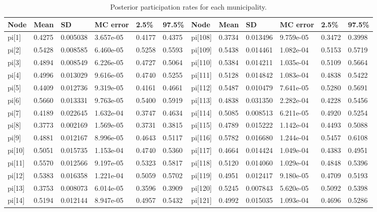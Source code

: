 \documentclass[12pt]{article}
\begin{document}
\begin{table}[h!]
\centering
\tiny
\caption{Posterior participation rates for each municipality.}
\label{tab:params1}
\begin{tabular}{|llllll|llllll|}
\hline
\textbf{Node} & \textbf{Mean} & \textbf{SD} & \textbf{MC error} & \textbf{2.5\%} &  \textbf{97.5\%} & \textbf{Node} & \textbf{Mean} & \textbf{SD} & \textbf{MC error} & \textbf{2.5\%} &  \textbf{97.5\%} \\ \hline
pi[1]  & 0.4275  & 0.005038  & 3.657e-05 & 0.4177 &0.4375 & pi[108] & 0.3734 & 0.013496 & 9.759e-05 & 0.3472 &0.3998  \\ 
pi[2]  & 0.5428  & 0.008585  & 6.460e-05 & 0.5258 &0.5593 & pi[109] & 0.5438 & 0.014461  & 1.082e-04 & 0.5153 &0.5719 \\ 
pi[3]  & 0.4894  & 0.008549  & 6.226e-05 & 0.4727 &0.5064 & pi[110] & 0.5384 & 0.014211 & 1.035e-04 & 0.5109 &0.5664 \\ 
pi[4]  & 0.4996  & 0.013029  & 9.616e-05 & 0.4740 &0.5255 & pi[111] & 0.5128 & 0.014842  & 1.083e-04 & 0.4838 &0.5422 \\ 
pi[5]  & 0.4409  & 0.012736  & 9.319e-05 & 0.4161 &0.4661 & pi[112] & 0.5487 & 0.010479   & 7.641e-05 & 0.5280 &0.5691 \\ 
pi[6]  & 0.5660  & 0.013331  & 9.763e-05 & 0.5400 &0.5919 & pi[113] & 0.4838 & 0.031350   & 2.282e-04 & 0.4228 &0.5456 \\
pi[7]  & 0.4189  & 0.022645  & 1.632e-04 & 0.3747 &0.4634 & pi[114] & 0.5085 & 0.008513   & 6.211e-05 & 0.4920 &0.5254\\ 
pi[8]  & 0.3773  & 0.002169  & 1.569e-05 & 0.3731 &0.3815 & pi[115] & 0.4789 & 0.015222   & 1.142e-04 & 0.4493 &0.5088 \\
pi[9]  & 0.4881  & 0.012167  & 8.996e-05 & 0.4643 &0.5117 & pi[116] & 0.5782 & 0.016680  & 1.244e-04 & 0.5457 &0.6108 \\
pi[10] & 0.5051  & 0.015735  & 1.153e-04 & 0.4740 &0.5360 & pi[117] & 0.4664 & 0.014424   & 1.049e-04 & 0.4383 &0.4951 \\ 
pi[11] & 0.5570  & 0.012566  & 9.197e-05 & 0.5323 &0.5817 & pi[118] & 0.5120 & 0.014060   & 1.029e-04 & 0.4848 &0.5396 \\ 
pi[12] & 0.5383  & 0.016358  & 1.221e-04 & 0.5059 &0.5702 & pi[119] & 0.4951 & 0.012417   & 9.180e-05 & 0.4709 &0.5193 \\ 
pi[13] & 0.3753  & 0.008073  & 6.014e-05 & 0.3596 &0.3909 & pi[120] & 0.5245 & 0.007843   & 5.620e-05 & 0.5092 &0.5398 \\ 
pi[14] & 0.5194  & 0.012144  & 8.947e-05 & 0.4957 &0.5432 & pi[121] & 0.4992 & 0.015035   & 1.093e-04 & 0.4696 &0.5286 \\ 

\end{tabular}
\end{table}
\end{document}
